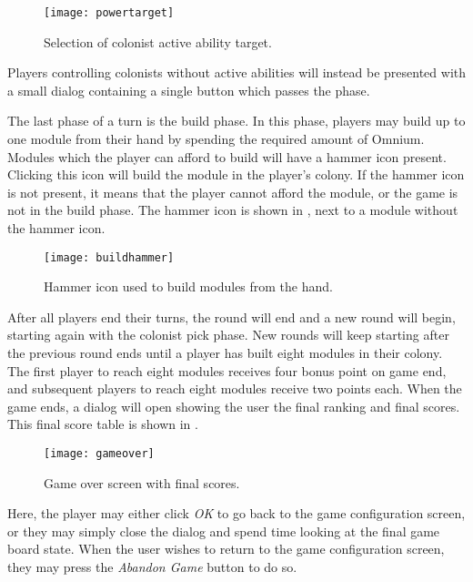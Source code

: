 \begin{figure}[ht]
\centerline{\mbox{\texttt{[image: powertarget]}}}
\caption{Selection of colonist active ability target.}\label{ud:powertarget}
\end{figure}

Players controlling colonists without active abilities will instead be presented
with a small dialog containing a single button which passes the phase.

The last phase of a turn is the build phase. In this phase, players may build
up to one module from their hand by spending the required amount of Omnium.
Modules which the player can afford to build will have a hammer icon present.
Clicking this icon will build the module in the player's colony. If the hammer
icon is not present, it means that the player cannot afford the module,
or the game is not in the build phase. The hammer icon is shown in
, next to a module without the hammer icon.

\begin{figure}[ht]
\centerline{\mbox{\texttt{[image: buildhammer]}}}
\caption{Hammer icon used to build modules from the hand.}\label{ud:buildhammer}
\end{figure}

After all players end their turns, the round will end and a new round will begin,
starting again with the colonist pick phase. New rounds will keep
starting after the previous round ends until a player has built eight
modules in their colony. The first player to reach eight modules receives
four bonus point on game end, and subsequent players to reach eight modules
receive two points each. When the game ends, a dialog will open showing the user
the final ranking and final scores. This final score table is shown in
.

\begin{figure}[ht]
\centerline{\mbox{\texttt{[image: gameover]}}}
\caption{Game over screen with final scores.}\label{ud:gameover}
\end{figure}

Here, the player may either click \emph{OK} to go back to the game configuration
screen, or they may simply close the dialog and spend time looking at the final
game board state. When the user wishes to return to the game configuration screen,
they may press the \emph{Abandon Game} button to do so.

\clearpage
